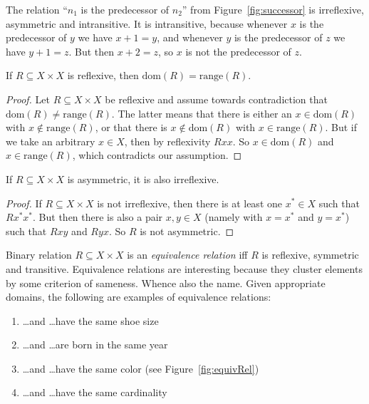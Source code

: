 \documentclass[nobib,nofonts]{tufte-handout}
\begin{document}
The relation ``$n_1$ is the predecessor of $n_2$'' from Figure~\ref{fig:successor} is
irreflexive, asymmetric and intransitive. It is intransitive, because whenever $x$ is the
predecessor of $y$ we have $x + 1= y$, and whenever $y$ is the predecessor of $z$ we have
$y + 1 = z$. But then $x + 2= z$, so $x$ is not the predecessor of $z$.

\begin{proposition}
  \label{prop:proof-reflexive-range}
  If $R \subseteq X \times X$ is reflexive, then $\text{dom}(R) = \text{range}(R)$.
\end{proposition}

\begin{proof}
  Let $R \subseteq X \times X$ be reflexive and assume towards contradiction that $\text{dom}(R) \neq \text{range}(R)$. The latter means that there is either an
  $x \in \text{dom}(R)$ with $x \not \in \text{range}(R)$, or that there is $x \not \in
  \text{dom}(R)$ with $x \in \text{range}(R)$. But if we take an arbitrary $x \in X$, then by
  reflexivity $Rxx$. So $x \in \text{dom}(R)$ and $x \in \text{range}(R)$, which contradicts
  our assumption.
\end{proof}

\begin{proposition}
  If $R \subseteq X \times X$ is asymmetric, it is also irreflexive.
\end{proposition}

\begin{proof}
  If $R \subseteq X \times X$ is not irreflexive, then there is at least one $x^* \in X$ such
  that $Rx^*x^*$. But then there is also a pair $x,y \in X$ (namely with $x=x^*$ and $y = x^*$)
  such that $Rxy$ and $Ryx$. So $R$ is not asymmetric.
\end{proof}

\noindent Binary relation $R \subseteq X \times X$ is an \emph{equivalence relation} iff $R$ is reflexive,
symmetric and transitive. Equivalence relations are interesting because they cluster elements
by some criterion of sameness. Whence also the name. Given appropriate domains, the following
are examples of equivalence relations:
\begin{enumerate}
\item[] \dots and \dots have the same shoe size
\item[] \dots and \dots are born in the same year
\item[] \dots and \dots have the same color (see Figure~\ref{fig:equivRel})
\item[] \dots and \dots have the same cardinality
\end{enumerate}
\end{document}
